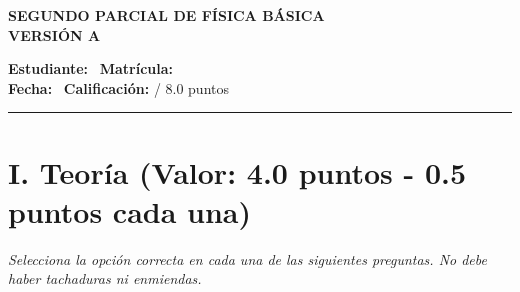 \documentclass[11pt,a4paper]{article}
\begin{document}
\begin{center}
    \textbf{\Large SEGUNDO PARCIAL DE FÍSICA BÁSICA} \\[0.2cm]
    \textbf{\large VERSIÓN A} \\[0.4cm]
\end{center}

\noindent \textbf{Estudiante:} \hrulefill \ \textbf{Matrícula:} \underline{\hspace{3cm}} \\[0.2cm]
\textbf{Fecha:} \underline{\hspace{4cm}} \ \textbf{Calificación:} \underline{\hspace{1.5cm}} / 8.0 puntos \\

\hrule
\section*{I. Teoría (Valor: 4.0 puntos - 0.5 puntos cada una)}
\textit{Selecciona la opción correcta en cada una de las siguientes preguntas. No debe haber tachaduras ni enmiendas.}
\end{document}
